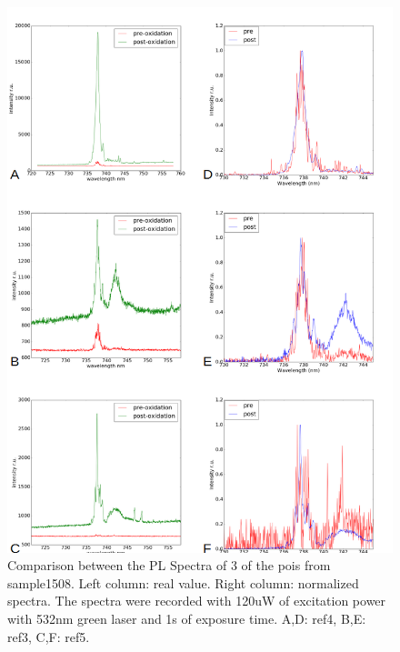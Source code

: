 \begin{figure}[h]
\centering
\includegraphics[width=1\linewidth]{Figures/pic/prepostoxidationspectra}
\caption{Comparison between the PL Spectra of 3 of the pois from sample1508. Left column: real value. Right column: normalized spectra. The spectra were recorded with 120uW of excitation power with 532nm green laser and 1s of exposure time. A,D: ref4, B,E: ref3, C,F: ref5.}
\label{fig:prepostoxidationspectra}
\end{figure}

